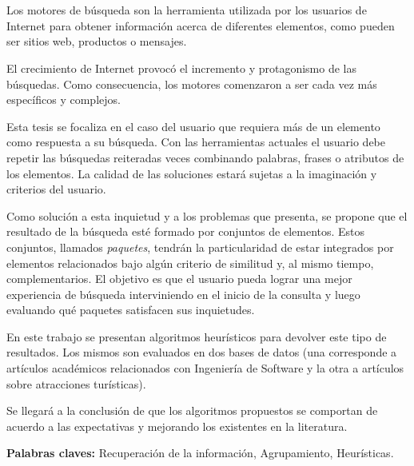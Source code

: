 \chapter*{\runtitulo}

\noindent 

Los motores de búsqueda son la herramienta utilizada por los usuarios de Internet para obtener información acerca de diferentes elementos, como pueden ser sitios web, productos o mensajes.

El crecimiento de Internet provocó el incremento y protagonismo de las búsquedas. Como consecuencia, los motores comenzaron a ser cada vez más específicos y complejos. 

Esta tesis se focaliza en el caso del usuario que requiera más de un elemento como respuesta a su búsqueda. Con las herramientas actuales el usuario debe repetir las búsquedas reiteradas veces combinando palabras, frases o atributos de los elementos. La calidad de las soluciones estará sujetas a la imaginación y criterios del usuario.

Como solución a esta inquietud y a los problemas que presenta, se propone que el resultado de la búsqueda esté formado por conjuntos de elementos. Estos conjuntos, llamados {\em paquetes}, tendrán la particularidad de estar integrados por elementos relacionados bajo algún criterio de similitud y, al mismo tiempo, complementarios. El objetivo es que el usuario pueda lograr una mejor experiencia de búsqueda interviniendo en el inicio de la consulta y luego evaluando qué paquetes satisfacen sus inquietudes.

En este trabajo se presentan algoritmos heurísticos para devolver este tipo de resultados. Los mismos son evaluados en dos bases de datos (una corresponde a artículos académicos relacionados con Ingeniería de Software y la otra a artículos sobre atracciones turísticas).

Se llegará a la conclusión de que los algoritmos propuestos se comportan de acuerdo a las expectativas y mejorando los existentes en la literatura.


\bigskip



\noindent\textbf{Palabras claves:} Recuperación de la información, Agrupamiento, Heurísticas.
